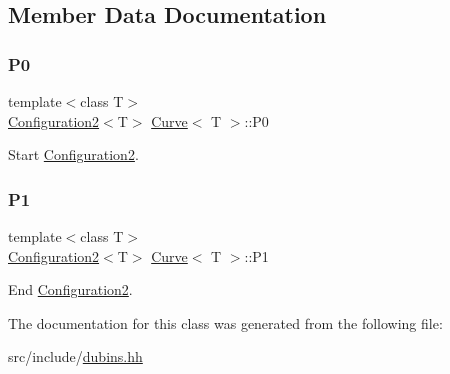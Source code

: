 \subsection{Member Data Documentation}
\mbox{\label{class_curve_a3a549faa5e4b5990da5d5cf67940fe24}} 
\subsubsection{\texorpdfstring{P0}{P0}}
{\footnotesize\ttfamily template$<$class T$>$ \\
\mbox{\hyperlink{class_configuration2}{Configuration2}}$<$T$>$ \mbox{\hyperlink{class_curve}{Curve}}$<$ T $>$\+::P0\hspace{0.3cm}{\ttfamily [protected]}}



Start {\ttfamily \mbox{\hyperlink{class_configuration2}{Configuration2}}}. 

\mbox{\label{class_curve_ab9eb1cded523a8de01c4514a4bf9e748}} 
\subsubsection{\texorpdfstring{P1}{P1}}
{\footnotesize\ttfamily template$<$class T$>$ \\
\mbox{\hyperlink{class_configuration2}{Configuration2}}$<$T$>$ \mbox{\hyperlink{class_curve}{Curve}}$<$ T $>$\+::P1\hspace{0.3cm}{\ttfamily [protected]}}



End {\ttfamily \mbox{\hyperlink{class_configuration2}{Configuration2}}}. 



The documentation for this class was generated from the following file\+:\begin{DoxyCompactItemize}
\item 
src/include/\mbox{\hyperlink{dubins_8hh}{dubins.\+hh}}\end{DoxyCompactItemize}
